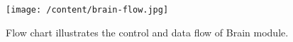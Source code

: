 \begin{figure}
	[h]
	\centering
	\texttt{[image: /content/brain-flow.jpg]} \caption{Flow chart illustrates the control and data flow of Brain module.} \label{fg:brain:flow} 
\end{figure}
